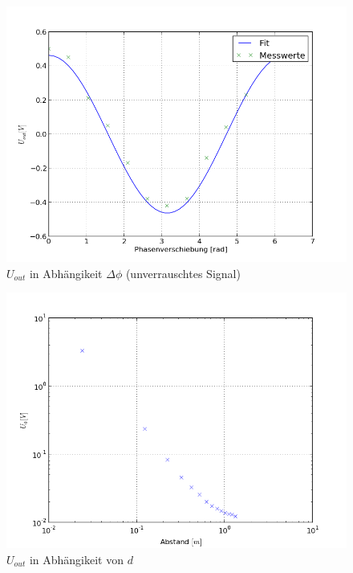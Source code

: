 \documentclass[11pt]{article}
\begin{document}
\begin{figure}[h]
\centering
\includegraphics[scale=0.50]{Diagramme/diag2.png}
\caption{$U_{out}$ in Abhängikeit $\Delta \phi$ (unverrauschtes Signal)}
\label{noisediag}
\end{figure}
\begin{figure}[h]
\centering
\includegraphics[scale=0.50]{Diagramme/diag3.png}
\caption{$U_{out}$ in Abhängikeit von $d$}
\label{logplot}
\end{figure}
\end{document}
